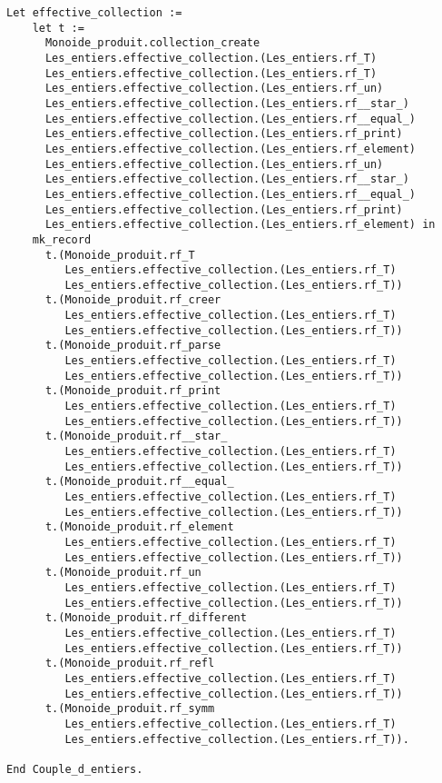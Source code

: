 {\begin{lstlisting}[language=MyCoq,title=\coq\ code for collections]
  Let effective_collection :=
    let t :=
      Monoide_produit.collection_create
      Les_entiers.effective_collection.(Les_entiers.rf_T)
      Les_entiers.effective_collection.(Les_entiers.rf_T)
      Les_entiers.effective_collection.(Les_entiers.rf_un)
      Les_entiers.effective_collection.(Les_entiers.rf__star_)
      Les_entiers.effective_collection.(Les_entiers.rf__equal_)
      Les_entiers.effective_collection.(Les_entiers.rf_print)
      Les_entiers.effective_collection.(Les_entiers.rf_element)
      Les_entiers.effective_collection.(Les_entiers.rf_un)
      Les_entiers.effective_collection.(Les_entiers.rf__star_)
      Les_entiers.effective_collection.(Les_entiers.rf__equal_)
      Les_entiers.effective_collection.(Les_entiers.rf_print)
      Les_entiers.effective_collection.(Les_entiers.rf_element) in 
    mk_record
      t.(Monoide_produit.rf_T
         Les_entiers.effective_collection.(Les_entiers.rf_T)
         Les_entiers.effective_collection.(Les_entiers.rf_T))
      t.(Monoide_produit.rf_creer
         Les_entiers.effective_collection.(Les_entiers.rf_T)
         Les_entiers.effective_collection.(Les_entiers.rf_T))
      t.(Monoide_produit.rf_parse
         Les_entiers.effective_collection.(Les_entiers.rf_T)
         Les_entiers.effective_collection.(Les_entiers.rf_T))
      t.(Monoide_produit.rf_print
         Les_entiers.effective_collection.(Les_entiers.rf_T)
         Les_entiers.effective_collection.(Les_entiers.rf_T))
      t.(Monoide_produit.rf__star_
         Les_entiers.effective_collection.(Les_entiers.rf_T)
         Les_entiers.effective_collection.(Les_entiers.rf_T))
      t.(Monoide_produit.rf__equal_
         Les_entiers.effective_collection.(Les_entiers.rf_T)
         Les_entiers.effective_collection.(Les_entiers.rf_T))
      t.(Monoide_produit.rf_element
         Les_entiers.effective_collection.(Les_entiers.rf_T)
         Les_entiers.effective_collection.(Les_entiers.rf_T))
      t.(Monoide_produit.rf_un
         Les_entiers.effective_collection.(Les_entiers.rf_T)
         Les_entiers.effective_collection.(Les_entiers.rf_T))
      t.(Monoide_produit.rf_different
         Les_entiers.effective_collection.(Les_entiers.rf_T)
         Les_entiers.effective_collection.(Les_entiers.rf_T))
      t.(Monoide_produit.rf_refl
         Les_entiers.effective_collection.(Les_entiers.rf_T)
         Les_entiers.effective_collection.(Les_entiers.rf_T))
      t.(Monoide_produit.rf_symm
         Les_entiers.effective_collection.(Les_entiers.rf_T)
         Les_entiers.effective_collection.(Les_entiers.rf_T)).
    
End Couple_d_entiers.
\end{lstlisting}}


